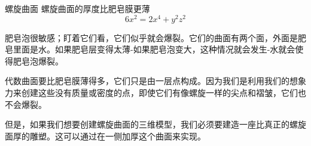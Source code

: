 ﻿\begin{surferPage}{螺旋曲面}
螺旋曲面的厚度比肥皂膜更薄\\
  \smallskip
\[6x^2	= 2x^4	+ y^2	z^2\]

\singlespacing

肥皂泡很敏感；盯着它们看，它们似乎就会爆裂。它们的曲面有两个面，外面是肥皂里面是水。如果肥皂层变得太薄-如果肥皂泡变大，这种情况就会发生-水就会使得肥皂泡爆裂。\\

\vspace{0,3cm}

代数曲面要比肥皂膜薄得多，它们只是由一层点构成。因为我们是利用我们的想象力来创建这些没有质量或密度的点，即使它们有像螺旋一样的尖点和褶皱，它们也不会爆裂。\\

\vspace{0,3cm}

但是，如果我们想要创建螺旋曲面的三维模型，我们必须要建造一座比真正的螺旋面厚的雕塑。这可以通过在一侧加厚这个曲面来实现。
\end{surferPage}
